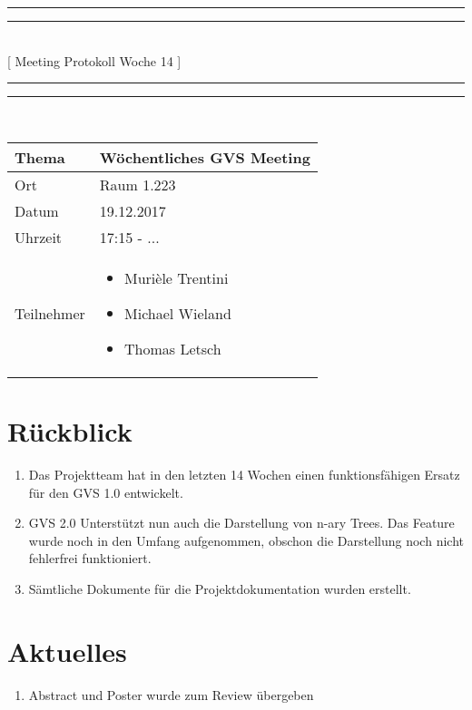 \documentclass[11pt, a4paper,oneside]{scrartcl}
\begin{document}
	\centering
	\rule{\textwidth}{1.6pt}\vspace*{-\baselineskip}\vspace*{2pt} %
	\rule{\textwidth}{0.4pt}\\[\baselineskip] %
	{\LARGE [ Meeting Protokoll Woche 14 ]}\\[0.2\baselineskip] %
	\rule{\textwidth}{0.4pt}\vspace*{-\baselineskip}\vspace{3.2pt} %
	\rule{\textwidth}{1.6pt}\\[2\baselineskip] %
	
	\begin{tabu} to \linewidth {l X }
		\toprule
		\textbf{Thema} & \textbf{Wöchentliches GVS Meeting} \\
		\midrule
		Ort & Raum 1.223 \\
		Datum & 19.12.2017  \\
		Uhrzeit &  17:15 - ...  \\
		Teilnehmer & 
		\begin{minipage}[t]{\textwidth}
			\begin{itemize}
				\item Murièle Trentini
				\item Michael Wieland
				\item Thomas Letsch
			\end{itemize}
		\end{minipage}
		\\
		\bottomrule
	\end{tabu}
	
	
	\section{Rückblick}
	\begin{enumerate}
		\item Das Projektteam hat in den letzten 14 Wochen einen funktionsfähigen Ersatz für den GVS 1.0 entwickelt.
		\item GVS 2.0 Unterstützt nun auch die Darstellung von n-ary Trees. Das Feature wurde noch in den Umfang aufgenommen, obschon die Darstellung noch nicht fehlerfrei funktioniert. 
		\item Sämtliche Dokumente für die Projektdokumentation wurden erstellt.
	\end{enumerate}
	
	\section{Aktuelles}
	\begin{enumerate}
		\item Abstract und Poster wurde zum Review übergeben
	\end{enumerate} 
	
\end{document}
